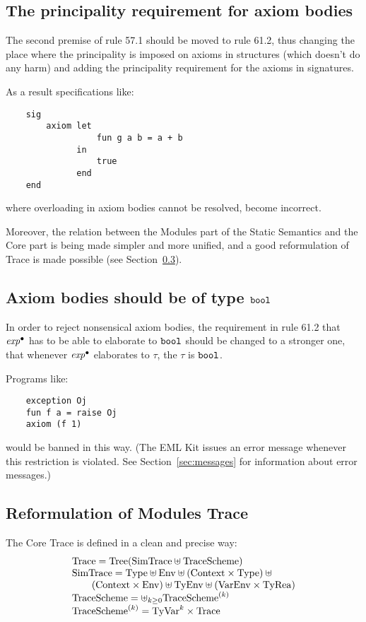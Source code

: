 \subsection{The principality requirement for axiom bodies}
\label{sec:principality}

The second premise of rule 57.1
should be moved to rule 61.2,
thus changing the place where the principality is imposed
on axioms in structures (which doesn't do any harm)
and adding the principality requirement for the axioms in signatures.

As a result specifications like:
\begin{verbatim}
    sig 
        axiom let 
                  fun g a b = a + b 
              in 
                  true 
              end 
    end 
\end{verbatim}
where overloading in axiom bodies cannot be resolved,
become incorrect.

Moreover, the relation between the Modules part of the Static Semantics and the Core part 
is being made simpler and more unified, and a good reformulation of Trace
is made possible (see Section~\ref{sec:reformulation}).

\subsection{Axiom bodies should be of type $\mbox{\tt bool}$}
\label{sec:bool}

In order to reject nonsensical axiom bodies,
the requirement in rule 61.2 that ${\it exp}^\bullet$ has to be able to elaborate to $\mbox{\tt bool}$
should be changed to a stronger one, that whenever ${\it exp}^\bullet$ elaborates
to $\tau$, the $\tau$ is $\mbox{\tt bool}$.

Programs like:

\begin{verbatim}
    exception Oj
    fun f a = raise Oj
    axiom (f 1)
\end{verbatim}

\noindent
would be banned in this way. 
(The EML Kit issues an error message whenever this restriction is violated. 
See Section~\ref{sec:messages} for information about error messages.)

\subsection{Reformulation of Modules Trace}
\label{sec:reformulation}

The Core Trace is defined in a clean and precise way:
\begin{displaymath}
\begin{array}{l}
\Trace = \Tree{\mbox{\SimTrace} \uplus\TraceScheme}\\
\SimTrace = \Type\uplus\Env\uplus(\Context\times\Type)\uplus\phantom{\Env}\\
\qquad (\Context\times\Env)\uplus\TyEnv\uplus(\VarEnv\times\TyRea)\\
\TraceScheme = \uplus_{k\geq 0} \TraceScheme^{(k)}\\
\TraceScheme^{(k)}=\mbox{TyVar}^k\times\Trace
\end{array}
\end{displaymath} 

